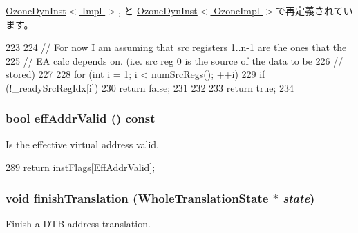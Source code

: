 \hyperlink{classOzoneDynInst_ae3a07556a5b5d8248cbfb1c99561340d}{OzoneDynInst$<$ Impl $>$}, と \hyperlink{classOzoneDynInst_ae3a07556a5b5d8248cbfb1c99561340d}{OzoneDynInst$<$ OzoneImpl $>$}で再定義されています。


\begin{DoxyCode}
223 {
224     // For now I am assuming that src registers 1..n-1 are the ones that the
225     // EA calc depends on.  (i.e. src reg 0 is the source of the data to be
226     // stored)
227 
228     for (int i = 1; i < numSrcRegs(); ++i) {
229         if (!_readySrcRegIdx[i])
230             return false;
231     }
232 
233     return true;
234 }
\end{DoxyCode}
\hypertarget{classBaseDynInst_a3e8dc2f81466d2399695ce78aba506da}{
\subsubsection[{effAddrValid}]{\setlength{\rightskip}{0pt plus 5cm}bool effAddrValid () const}}
\label{classBaseDynInst_a3e8dc2f81466d2399695ce78aba506da}
Is the effective virtual address valid. 


\begin{DoxyCode}
289 { return instFlags[EffAddrValid]; }
\end{DoxyCode}
\hypertarget{classBaseDynInst_a36c2a28eca3086b67fc7168a37367e98}{
\subsubsection[{finishTranslation}]{\setlength{\rightskip}{0pt plus 5cm}void finishTranslation ({\bf WholeTranslationState} $\ast$ {\em state})}}
\label{classBaseDynInst_a36c2a28eca3086b67fc7168a37367e98}
Finish a DTB address translation. 


